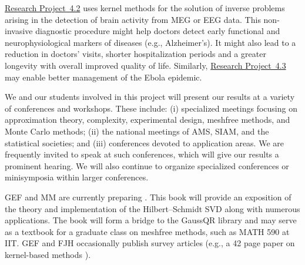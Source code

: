 \documentclass[11pt]{NSFamsart}
\newcommand{\refprobdb}{\hyperref[SectMEEG]{Research Project~4.2}\xspace}
\newcommand{\refprobdc}{\hyperref[ebolasubsec]{Research Project~4.3}\xspace}
\begin{document}
\begin{description}[leftmargin=0ex]
\item[Promoting the Well-being of the Broader Society]
\refprobdb uses kernel methods for the solution of inverse problems arising in the detection of brain activity from MEG or EEG data. This non-invasive diagnostic procedure might help doctors detect early functional and neurophysiological markers of diseases (e.g., Alzheimer's). It might also lead to a reduction in doctors' visits, shorter hospitalization periods and a greater longevity with overall improved quality of life. Similarly, \refprobdc may enable better management of the Ebola epidemic.

\item[Organizing and Presenting at Conferences]
We and our students involved in this project will present our results at a variety of conferences and workshops.  These include: (i) specialized meetings focusing on approximation theory, complexity, experimental design, meshfree methods, and Monte Carlo methods; (ii) the national meetings of AMS, SIAM, and the statistical societies; and (iii) conferences devoted to application areas.  We are frequently invited to speak at such conferences, which will give our results a prominent hearing. We will also continue to organize specialized conferences or minisymposia within larger conferences.

\item[Writing Textbooks and Survey Papers]
GEF and MM are currently preparing \citep{FMcC15}. This book will provide an exposition of the theory and implementation of the Hilbert--Schmidt SVD along with numerous applications. The book will form a bridge to the GaussQR library \citep{McCFBG13} and may serve as a textbook for a graduate class on meshfree methods, such as MATH 590 at IIT. GEF and FJH occasionally publish survey articles (e.g., a 42 page paper on kernel-based methods \citep{Fasshauer11}).


\end{description}
\end{document}
